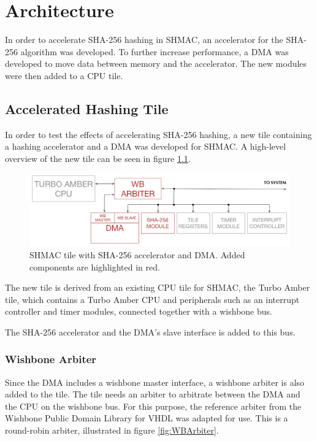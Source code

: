 \chapter{Architecture}
\label{cha:architecture}

In order to accelerate SHA-256 hashing in SHMAC, an accelerator for the SHA-256 algorithm
was developed. To further increase performance, a DMA was developed to move data between
memory and the accelerator. The new modules were then added to a CPU tile.

\section{Accelerated Hashing Tile}
\label{sec:aht}

In order to test the effects of accelerating SHA-256 hashing, a new tile containing a hashing
accelerator and a DMA was developed for SHMAC. A high-level overview of the new tile can be
seen in figure \ref{fig:SHA-Tile}.

\begin{figure}[htb]
    \centering
    \includegraphics[width=1.0\textwidth]{Figures/Tile/HashingTile}
    \caption{SHMAC tile with SHA-256 accelerator and DMA. Added components are highlighted in red.}
    \label{fig:SHA-Tile}
\end{figure}

The new tile is derived from an existing CPU tile for SHMAC, the Turbo Amber tile, which contains
a Turbo Amber CPU and peripherals such as an interrupt controller and timer modules, connected
together with a wishbone bus.

The SHA-256 accelerator and the DMA's slave interface is added to this bus.

\subsection{Wishbone Arbiter}
Since the DMA includes a wishbone master interface, a wishbone arbiter is also added to the tile.
The tile needs an arbiter to arbitrate between the DMA and the CPU on the wishbone bus.
For this purpose, the reference arbiter from the Wishbone Public Domain Library for VHDL %
was adapted for use. This is a round-robin arbiter, illustrated in figure \ref{fig:WBArbiter}.

